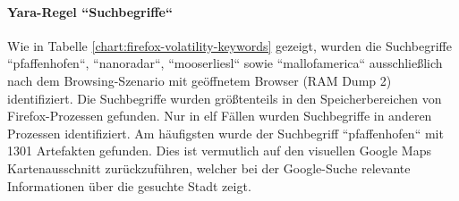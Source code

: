 \paragraph*{Yara-Regel ``Suchbegriffe``}
Wie in Tabelle \ref{chart:firefox-volatility-keywords} gezeigt, wurden die Suchbegriffe ``pfaffenhofen``, ``nanoradar``, ``mooserliesl`` sowie ``mallofamerica`` ausschließlich nach dem Browsing-Szenario mit geöffnetem Browser (RAM Dump 2) identifiziert. Die Suchbegriffe wurden größtenteils in den Speicherbereichen von Firefox-Prozessen gefunden. Nur in elf Fällen wurden Suchbegriffe in anderen Prozessen identifiziert. Am häufigsten wurde der Suchbegriff ``pfaffenhofen`` mit 1301 Artefakten gefunden. Dies ist vermutlich auf den  visuellen Google Maps Kartenausschnitt zurückzuführen, welcher bei der Google-Suche relevante Informationen über die gesuchte Stadt zeigt. 

